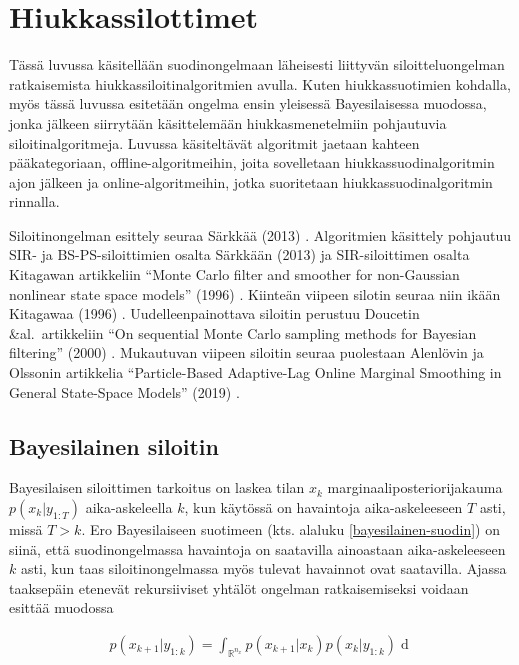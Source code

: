 \documentclass[
  12pt,
  a4paper, twoside]{book}
\begin{document}
\chapter{Hiukkassilottimet} \label{hiukkassiloittimet}

Tässä luvussa käsitellään suodinongelmaan läheisesti liittyvän siloitteluongelman ratkaisemista hiukkassiloitinalgoritmien avulla. Kuten hiukkassuotimien kohdalla, myös tässä luvussa esitetään ongelma ensin yleisessä Bayesilaisessa muodossa, jonka jälkeen siirrytään käsittelemään hiukkasmenetelmiin pohjautuvia siloitinalgoritmeja. Luvussa käsiteltävät algoritmit jaetaan kahteen pääkategoriaan, offline-algoritmeihin, joita sovelletaan hiukkassuodinalgoritmin ajon jälkeen ja online-algoritmeihin, jotka suoritetaan hiukkassuodinalgoritmin rinnalla.

Siloitinongelman esittely seuraa Särkkää (2013) \citep{sarkka-2013}. Algoritmien käsittely pohjautuu SIR- ja BS-PS-siloittimien osalta Särkkään (2013) \citep{sarkka-2013} ja SIR-siloittimen osalta Kitagawan artikkeliin ``Monte Carlo filter and smoother for non-Gaussian nonlinear state space models'' (1996) \citep{kitagawa-1996}. Kiinteän viipeen silotin seuraa niin ikään Kitagawaa (1996) \citep{kitagawa-1996}. Uudelleenpainottava siloitin perustuu Doucetin \&al.~artikkeliin ``On sequential Monte Carlo sampling methods for Bayesian filtering'' (2000) \citep{Doucet-2000}. Mukautuvan viipeen siloitin seuraa puolestaan Alenlövin ja Olssonin artikkelia ``Particle-Based Adaptive-Lag Online Marginal Smoothing in General State-Space Models'' (2019) \citep{alenlov-2019}.

\section{Bayesilainen siloitin}

Bayesilaisen siloittimen tarkoitus on laskea tilan \(x_k\) marginaaliposteriorijakauma \(p(x_k|y_{1:T})\) aika-askeleella \(k\), kun käytössä on havaintoja aika-askeleeseen \(T\) asti, missä \(T>k\). Ero Bayesilaiseen suotimeen (kts. alaluku \ref{bayesilainen-suodin}) on siinä, että suodinongelmassa havaintoja on saatavilla ainoastaan aika-askeleeseen \(k\) asti, kun taas siloitinongelmassa myös tulevat havainnot ovat saatavilla. Ajassa taaksepäin etenevät rekursiiviset yhtälöt ongelman ratkaisemiseksi voidaan esittää muodossa

\begin{align}\label{siloitin-prediktiivinen}
p(x_{k+1}|y_{1:k})=\int_{\mathbb{R}^{n_x}}p(x_{k+1}|x_k)p(x_k|y_{1:k})\mathop{dx_k}
\end{align}
\end{document}
